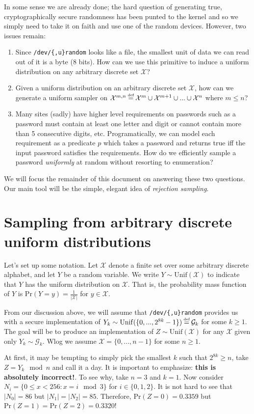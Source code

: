 \documentclass[10pt]{article}
\newcommand{\X}{\mathcal{X}}
\newcommand{\G}{\mathcal{G}}
\newcommand{\abs}[1]{\left| #1 \right|}
\newcommand{\Unif}{\mathrm{Unif}}
\renewcommand{\Pr}{\mathrm{Pr}}
\newcommand\defeq{\stackrel{\mathclap{\normalfont\tiny\mbox{def}}}{=}}
\begin{document}
In some sense we are already done; the hard question of generating true,
cryptographically secure randomness has been punted to the kernel and so we
simply need to take it on faith and use one of the random devices. However, two
issues remain:
\begin{enumerate}
  \item Since \verb|/dev/{,u}random| looks like a file, the smallest unit of data
    we can read out of it is a byte (8 bits). How can we use this primitive to induce
    a uniform distribution on any arbitrary discrete set $\X$?
  \item Given a uniform distribution on an arbitrary discrete set $\X$, how can
    we generate a uniform sampler on $\X^{m,n} \defeq \X^m \cup \X^{m+1} \cup ... \cup \X^{n}$ 
    where $m \leq n$?
  \item Many sites (sadly) have higher level requirements on passwords such as 
    a password must contain at least one letter and digit or cannot contain
    more than 5 consecutive digits, etc. Programatically, we can model each
    requirement as a predicate $p$ which takes a password and returns true iff
    the input password satisfies the requirements. How do we efficiently sample
    a password \emph{uniformly} at random without resorting to enumeration?
\end{enumerate}
We will focus the remainder of this document on answering these two questions.
Our main tool will be the simple, elegant idea of \emph{rejection sampling}. 

\section{Sampling from arbitrary discrete uniform distributions}
\label{sec:unif}
Let's set up some notation. Let $\X$ denote a finite set over some arbitrary
discrete alphabet, and let $Y$ be a random variable. We write $Y \sim
\Unif(\X)$ to indicate that $Y$ has the uniform distribution on $\X$.  That is,
the probability mass function of $Y$ is $\Pr(Y=y) = \frac{1}{\abs{\X}}$ for $y \in \X$.

From our discussion above, we will assume that \verb|/dev/{,u}random| provides
us with a secure implementation of $Y_k \sim \Unif(\{0, ..., 2^{8k} - 1\}) \defeq \G_k$ for some $k \geq 1$.
%
The goal will be to produce an implementation of $Z \sim \Unif(\X)$ for any
$\X$ given only $Y_k \sim \G_k$. Wlog we assume $\X = \{0, ..., n-1\}$ for some $n
\geq 1$.

At first, it may be tempting to simply pick the smallest $k$ such that $2^{8k}
\geq n$, take $Z = Y_k \mod{n}$ and call it a day. It is
important to emphasize: \textbf{this is absolutely incorrect!}.
%
To see why, take $n=3$ and $k=1$. Now consider $N_i = \{ 0 \leq x < 256 : x = i \mod{3}
\}$ for $i \in \{0,1,2\}$. It is not hard to see that $\abs{N_0} = 86$ but
$\abs{N_1}=\abs{N_2} = 85$. Therefore, $\Pr(Z=0) = 0.3359$ but
$\Pr(Z=1)=\Pr(Z=2)=0.3320$!
\end{document}
